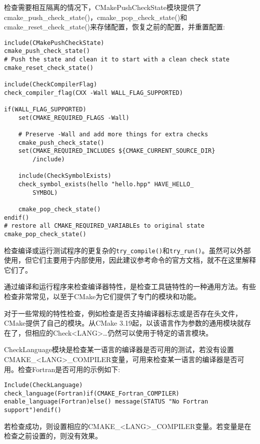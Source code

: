 检查需要相互隔离的情况下，CMakePushCheckState模块提供了cmake\_push\_check\_state()，cmake\_pop\_check\_state()和cmake\_reset\_check\_state()来存储配置，恢复之前的配置，并重置配置:

\begin{lstlisting}[style=styleCMake]
include(CMakePushCheckState)
cmake_push_check_state()
# Push the state and clean it to start with a clean check state
cmake_reset_check_state()

include(CheckCompilerFlag)
check_compiler_flag(CXX -Wall WALL_FLAG_SUPPORTED)

if(WALL_FLAG_SUPPORTED)
	set(CMAKE_REQUIRED_FLAGS -Wall)
	
	# Preserve -Wall and add more things for extra checks
	cmake_push_check_state()
	set(CMAKE_REQUIRED_INCLUDES ${CMAKE_CURRENT_SOURCE_DIR}
		/include)

	include(CheckSymbolExists)
	check_symbol_exists(hello "hello.hpp" HAVE_HELLO_
		SYMBOL)
	
	cmake_pop_check_state()
endif()
# restore all CMAKE_REQUIRED_VARIABLEs to original state
cmake_pop_check_state()
\end{lstlisting}

检查编译或运行测试程序的更复杂的\texttt{try\_compile()}和\texttt{try\_run()}。虽然可以外部使用，但它们主要用于内部使用，因此建议参考命令的官方文档，就不在这里解释它们了。

通过编译和运行程序来检查编译器特性，是检查工具链特性的一种通用方法。有些检查非常常见，以至于CMake为它们提供了专门的模块和功能。


对于一些常规的特性检查，例如检查是否支持编译器标志或是否存在头文件，CMake提供了自己的模块。从CMake 3.19起，以该语言作为参数的通用模块就存在了，但相应的Check<LANG>…仍然可以使用于特定的语言模块。

CheckLanguage模块是检查某一语言的编译器是否可用的测试，若没有设置CMAKE\_<LANG>\_COMPILER变量，可用来检查某一语言的编译器是否可用。检查Fortran是否可用的示例如下:

\begin{lstlisting}[style=styleCMake]
Include(CheckLanguage)
check_language(Fortran)if(CMAKE_Fortran_COMPILER)
enable_language(Fortran)else() message(STATUS "No Fortran
support")endif()
\end{lstlisting}

若检查成功，则设置相应的CMAKE\_<LANG>\_COMPILER变量。若变量是在检查之前设置的，则没有效果。


